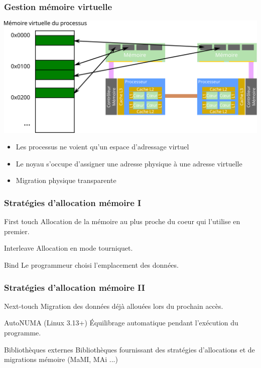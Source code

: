 \documentclass{beamer}
\begin{document}
\begin{frame}
  \frametitle{Gestion mémoire virtuelle}
  \centerline{\includegraphics[width=0.8\linewidth]{virtual}}

  \begin{itemize}
    \item Les processus ne voient qu'un espace d'adressage virtuel
    \item Le noyau s'occupe d'assigner une adresse physique à une adresse virtuelle
    \item Migration physique transparente
  \end{itemize}
\end{frame}

\begin{frame}
  \frametitle{Stratégies d'allocation mémoire I}

  \begin{block}{First touch}
    Allocation de la mémoire au plus proche du coeur qui l'utilise en premier.
  \end{block}

  \pause

  \begin{block}{Interleave}
    Allocation en mode tourniquet.
  \end{block}

  \pause

  \begin{block}{Bind}
    Le programmeur choisi l'emplacement des données.
  \end{block}
\end{frame}


\begin{frame}
  \frametitle{Stratégies d'allocation mémoire II}

  \begin{block}{Next-touch}
    Migration des données déjà allouées lors du prochain accès.
  \end{block}

  \pause

  \begin{block}{AutoNUMA (Linux 3.13+)}
    \'Equilibrage automatique pendant l'exécution du programme.
  \end{block}

  \pause

  \begin{block}{Bibliothèques externes}
    Bibliothèques fournissant des stratégies d'allocations et de migrations mémoire (MaMI, MAi ...)
  \end{block}

\end{frame}
\end{document}
